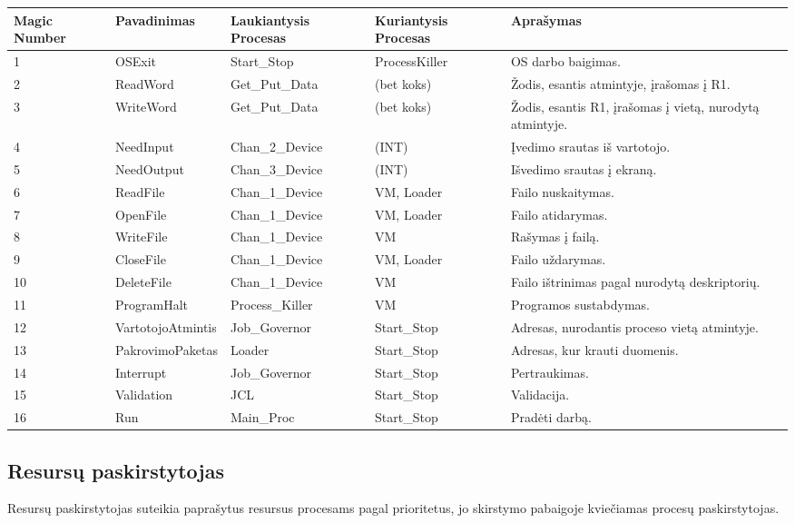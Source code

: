 		\begin{tabular}{| p{} |*{3} {p{} |} p{5cm}|}
			\hline
			Magic Number	& Pavadinimas	& Laukiantysis Procesas	& Kuriantysis Procesas	& Aprašymas\\
			\hline
			1 				& OSExit		& Start\_Stop			& ProcessKiller			& OS darbo baigimas.\\
			\hline
			2				& ReadWord		& Get\_Put\_Data		& (bet koks)			& Žodis, esantis atmintyje, įrašomas į R1.\\	
			\hline
			3				& WriteWord		& Get\_Put\_Data		& (bet koks)			& Žodis, esantis R1, įrašomas į vietą, nurodytą atmintyje.\\
			\hline
			4				& NeedInput		& Chan\_2\_Device		& (INT)					& Įvedimo srautas iš vartotojo.\\
			\hline
			5				& NeedOutput	& Chan\_3\_Device		& (INT)					& Išvedimo srautas į ekraną.\\
			\hline
			6				& ReadFile		& Chan\_1\_Device		& VM, Loader			& Failo nuskaitymas.\\
			\hline
			7				& OpenFile		& Chan\_1\_Device		& VM, Loader			& Failo atidarymas.\\
			\hline
			8				& WriteFile		& Chan\_1\_Device		& VM					& Rašymas į failą.\\
			\hline
			9				& CloseFile		& Chan\_1\_Device		& VM, Loader			& Failo uždarymas.\\
			\hline
			10				& DeleteFile	& Chan\_1\_Device		& VM					& Failo ištrinimas pagal nurodytą deskriptorių.\\
			\hline
			11				& ProgramHalt	& Process\_Killer		& VM					& Programos sustabdymas.\\
			\hline
			12				& VartotojoAtmintis 	& Job\_Governor	& Start\_Stop			& Adresas, nurodantis proceso vietą atmintyje.\\
			\hline
			13				& PakrovimoPaketas		& Loader		& Start\_Stop			& Adresas, kur krauti duomenis.\\
			\hline
			14				& Interrupt		& Job\_Governor   		& Start\_Stop			& Pertraukimas.\\
			\hline		
			15				& Validation	& JCL					& Start\_Stop			& Validacija.\\
			\hline
			16				& Run			& Main\_Proc			& Start\_Stop			& Pradėti darbą.\\
			\hline 
			
		\end{tabular}
		
		
	\subsection{Resursų paskirstytojas}
		Resursų paskirstytojas suteikia paprašytus resursus procesams pagal prioritetus, jo skirstymo pabaigoje kviečiamas procesų paskirstytojas. 
